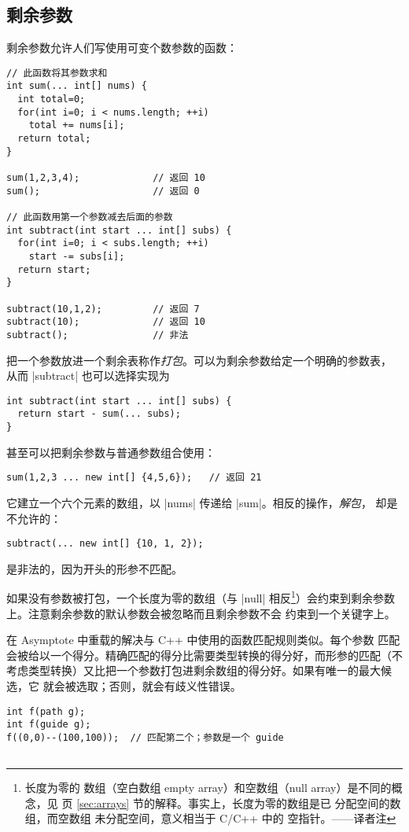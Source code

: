 \documentclass{ctexbook}
\newcommand*\prgname[1]{\textsf{#1}}
\newcommand\transnote[1]{\footnote{#1——译者注}}
\begin{document}
{{{\subsection{剩余参数}
\label{subsec:restarguments}

剩余参数允许人们写使用可变个数参数的函数：
\begin{lstlisting}
// 此函数将其参数求和
int sum(... int[] nums) {
  int total=0;
  for(int i=0; i < nums.length; ++i)
    total += nums[i];
  return total;
}

sum(1,2,3,4);             // 返回 10
sum();                    // 返回 0

// 此函数用第一个参数减去后面的参数
int subtract(int start ... int[] subs) {
  for(int i=0; i < subs.length; ++i)
    start -= subs[i];
  return start;
}

subtract(10,1,2);         // 返回 7
subtract(10);             // 返回 10
subtract();               // 非法
\end{lstlisting}

把一个参数放进一个剩余表称作\emph{打包}。可以为剩余参数给定一个明确的参数表，
从而 |subtract| 也可以选择实现为
\begin{lstlisting}
int subtract(int start ... int[] subs) {
  return start - sum(... subs);
}
\end{lstlisting}

甚至可以把剩余参数与普通参数组合使用：
\begin{lstlisting}
sum(1,2,3 ... new int[] {4,5,6});   // 返回 21
\end{lstlisting}
它建立一个六个元素的数组，以 |nums| 传递给 |sum|。相反的操作，\emph{解包}，
却是不允许的：
\begin{lstlisting}
subtract(... new int[] {10, 1, 2});
\end{lstlisting}
是非法的，因为开头的形参不匹配。

如果没有参数被打包，一个长度为零的数组（与 |null| 相反\transnote{长度为零的
数组（空白数组 empty array）和空数组（null array）是不同的概念，见
\pageref{sec:arrays} 页 \ref{sec:arrays} 节的解释。事实上，长度为零的数组是已
分配空间的数组，而空数组 \inlinecode{null} 未分配空间，意义相当于 C/C++ 中的
空指针。}）会约束到剩余参数上。注意剩余参数的默认参数会被忽略而且剩余参数不会
约束到一个关键字上。

在 \prgname{Asymptote} 中重载的解决与 C++ 中使用的函数匹配规则类似。每个参数
匹配会被给以一个得分。精确匹配的得分比需要类型转换的得分好，而形参的匹配（不
考虑类型转换）又比把一个参数打包进剩余数组的得分好。如果有唯一的最大候选，它
就会被选取；否则，就会有歧义性错误。
\begin{lstlisting}
int f(path g);
int f(guide g);
f((0,0)--(100,100));  // 匹配第二个；参数是一个 guide


\end{lstlisting}}}}
\end{document}

